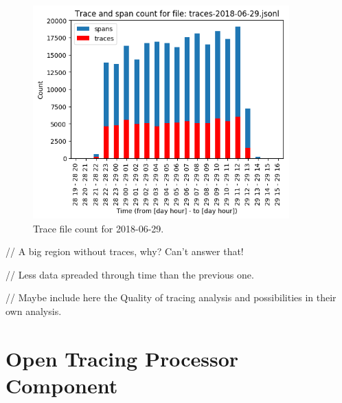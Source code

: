 \begin{figure}[H]
    \centering
    \includegraphics[width=0.88\textwidth]{images/trace_file_count_2018_06_29_chart.png}
    \caption{Trace file count for 2018-06-29.}
    \label{fig:trace_file_count_2018_06_29}
\end{figure}

// A big region without traces, why? Can't answer that!

// Less data spreaded through time than the previous one.

// Maybe include here the Quality of tracing analysis and possibilities in their own analysis.


\section{Open Tracing Processor Component}
\label{sec:open_tracing_processor_component}

